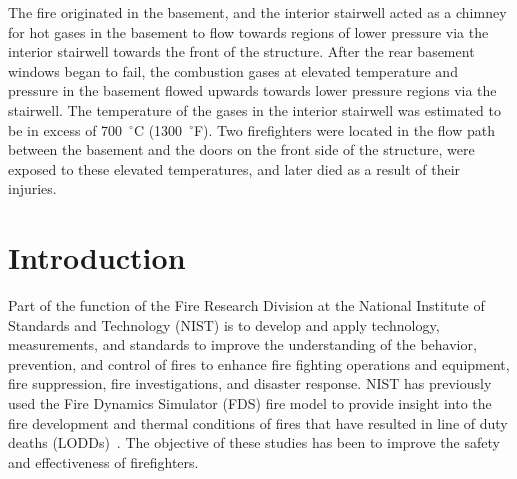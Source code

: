 \documentclass[12pt,oneside]{book}
\begin{document}
The fire originated in the basement, and the interior stairwell acted as a chimney for hot gases in the basement to flow towards regions of lower pressure via the interior stairwell towards the front of the structure. After the rear basement windows began to fail, the combustion gases at elevated temperature and pressure in the basement flowed upwards towards lower pressure regions via the stairwell. The temperature of the gases in the interior stairwell was estimated to be in excess of 700~$^{\circ}$C (1300~$^{\circ}$F). Two firefighters were located in the flow path between the basement and the doors on the front side of the structure, were exposed to these elevated temperatures, and later died as a result of their injuries.


\chapter{Introduction}
\label{sec:introduction}
\setcounter{page}{1}

Part of the function of the Fire Research Division at the National Institute of Standards and Technology (NIST) is to develop and apply technology, measurements, and standards to improve the understanding of the behavior, prevention, and control of fires to enhance fire fighting operations and equipment, fire suppression, fire investigations, and disaster response. NIST has previously used the Fire Dynamics Simulator (FDS) fire model to provide insight into the fire development and thermal conditions of fires that have resulted in line of duty deaths (LODDs)~\cite{Madrzykowski:1,Iowa,Texas,Bryner:Charleston,barowy:texas,Weinschenk:Chicago}. The objective of these studies has been to improve the safety and effectiveness of firefighters.
\end{document}
